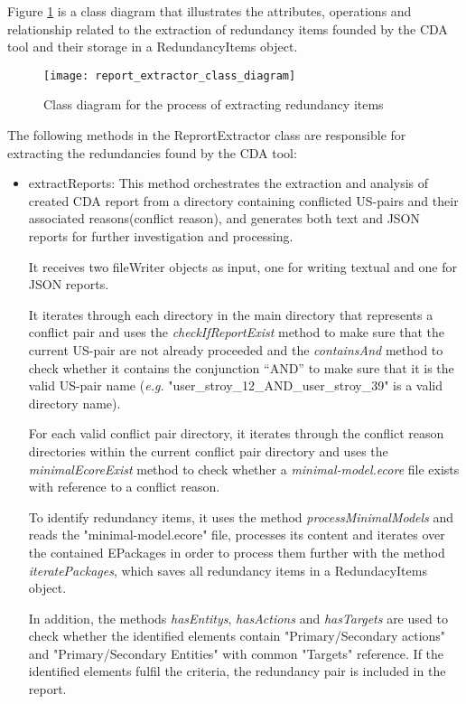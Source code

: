 Figure \ref{fig:report_extractor_class_diagram} is a class diagram that illustrates the attributes, operations and relationship related to the extraction of redundancy items founded by the CDA tool and their storage in a RedundancyItems object.
\begin{figure}[h]
	\centering
	\texttt{[image: report\_extractor\_class\_diagram]}
	\caption{Class diagram for the process of extracting redundancy items}\label{fig:report_extractor_class_diagram}
\end{figure} 

The following methods in the ReprortExtractor class are responsible for extracting the redundancies found by the CDA tool:
\begin{itemize}
	\item extractReports: This method orchestrates the extraction and analysis of created CDA report from a directory containing conflicted US-pairs and their associated reasons(conflict reason), and generates both text and JSON reports for further investigation and processing.
	
	It receives two fileWriter objects as input, one for writing textual and one for JSON reports.
	
	It iterates through each directory in the main directory that represents a conflict pair and uses the \textit{checkIfReportExist} method to make sure that the current US-pair are not already proceeded and the \textit{containsAnd} method to check whether it contains the conjunction \enquote{AND} to make sure that it is the valid US-pair name (\textit{e.g.} "user\_stroy\_12\_AND\_user\_stroy\_39" is a valid directory name).
	
	For each valid conflict pair directory, it iterates through the conflict reason directories within the current conflict pair directory and uses the \textit{minimalEcoreExist} method to check whether a \textit{minimal-model.ecore} file exists with reference to a conflict reason.
	
	To identify redundancy items, it uses the method \textit{processMinimalModels} and reads the "minimal-model.ecore" file, processes its content and iterates over the contained EPackages in order to process them further with the method \textit{iteratePackages}, which saves all redundancy items in a RedundacyItems object.
	
	In addition, the methods \textit{hasEntitys}, \textit{hasActions} and \textit{hasTargets} are used to check whether the identified elements contain "Primary/Secondary actions" and "Primary/Secondary Entities" with common "Targets" reference. If the identified elements fulfil the criteria, the redundancy pair is included in the report.
	

\end{itemize}

